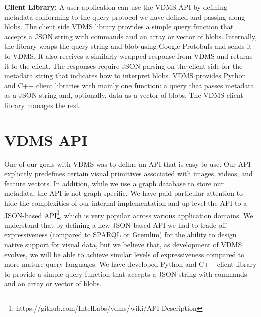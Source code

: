 \textbf{Client Library:}
A user application can use the VDMS API by defining metadata conforming to the
query protocol we have defined and passing along blobs. The client side VDMS
library provides a simple query function that accepts a JSON string with
commands and an array or vector of blobs.
Internally, the library wraps the query string and blob using Google Protobufs
and sends it to VDMS. It also receives a similarly wrapped response from VDMS
and returns it to the client. The responses require JSON parsing on the client
side for the metadata string that indicates how to interpret blobs.
VDMS provides Python and C++ client libraries with mainly
one function: a query that passes metadata as a JSON string and,
optionally, data as a vector of blobs. The VDMS client library manages the
rest.

\section{VDMS API}
\label{arch}
One of our goals with VDMS was to define an API that is easy to use.
Our API explicitly predefines certain
visual primitives associated with images, videos, and feature vectors. In
addition, while we use a graph database to store our metadata, the API is not
graph specific.
We have paid particular attention to hide the complexities of our internal
implementation and up-level the API to a JSON-based
API\footnote{https://github.com/IntelLabs/vdms/wiki/API-Description},
which is very popular across various application domains.
We understand that by defining a new JSON-based API we had to trade-off
expressiveness (compared to SPARQL or Gremlim) for the ability to design
native support for visual data, but we believe that, as development of VDMS
evolves, we will be able to achieve similar levels of expressiveness compared
to more mature query languages.
We have developed Python and C++ client
library to provide a simple query function that accepts a JSON string with
commands and an array or vector of blobs.

